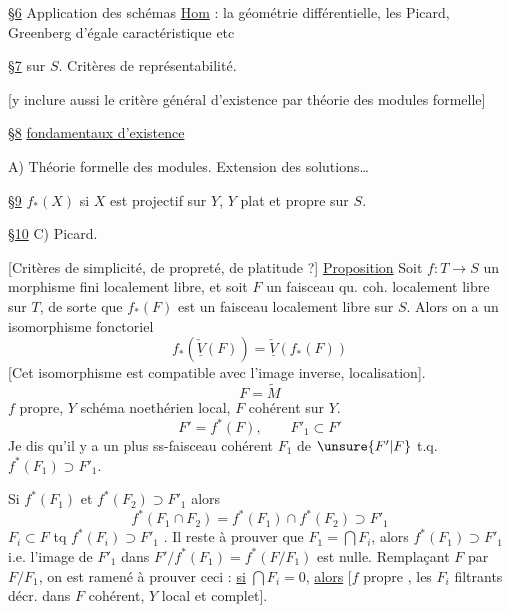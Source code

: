 \uline{\S6} Application des schémas \uline{Hom} : la géométrie différentielle, les Picard, Greenberg d'égale caractéristique etc

\uline{\S7}  sur $S$. Critères de représentabilité.

[y inclure aussi le critère général d'existence par théorie des modules formelle]

\uline{\S8}    \uline{fondamentaux d'existence}

A) Théorie formelle des modules. Extension des solutions\ldots

\uline{\S9}  $f_*(X)$ si $X$ est projectif sur $Y$, $Y$ plat et propre sur $S$.

\uline{\S10} C) Picard.

[Critères de simplicité, de propreté, de platitude ?]
\uline{Proposition} Soit $f:T\to S$ un morphisme fini localement libre, et soit  $F$ un faisceau qu. coh. localement libre sur $T$, de sorte que $f_*(F)$ est un faisceau  localement libre sur $S$. Alors on a un isomorphisme fonctoriel
\[
\boxed{f_*(\underline{\check V}(F))=\underline{\check V}(f_*(F))}
\]
[Cet isomorphisme est compatible avec l’image inverse,  localisation].
\[
F=\widetilde M
\]
$f$  propre, $Y$ schéma noethérien local, $F$ cohérent sur $Y$.
\[
F'=f^*(F),\qquad F'_1\subset F'
\]
 Je dis qu'il y a un plus  ss-faisceau cohérent $F_1$ de $\unsure{F'|F}$ t.q. $f^*(F_1)\supset F'_1$.

Si $f^*(F_1)$ et $f^*(F_2)\supset F'_1$ alors
\[
f^*(F_1\cap F_2)=f^*(F_1)\cap f^*(F_2)\supset F'_1
\]
$F_i\subset F$ tq $f^*(F_i)\supset F'_1$  . Il reste à prouver que $F_1=\bigcap F_i$, alors $f^*(F_1)\supset F'_1$ i.e. l'image de $F'_1$ dans $F'/f^*(F_1)=f^*(F/F_1)$ est nulle. Remplaçant $F$ par $F/F_1$, on est ramené à prouver ceci : \uline{si} $\bigcap F_i=0$, \uline{alors}   [$f$ propre , les $F_i$ filtrants décr. dans $F$ cohérent, $Y$ local et complet].

